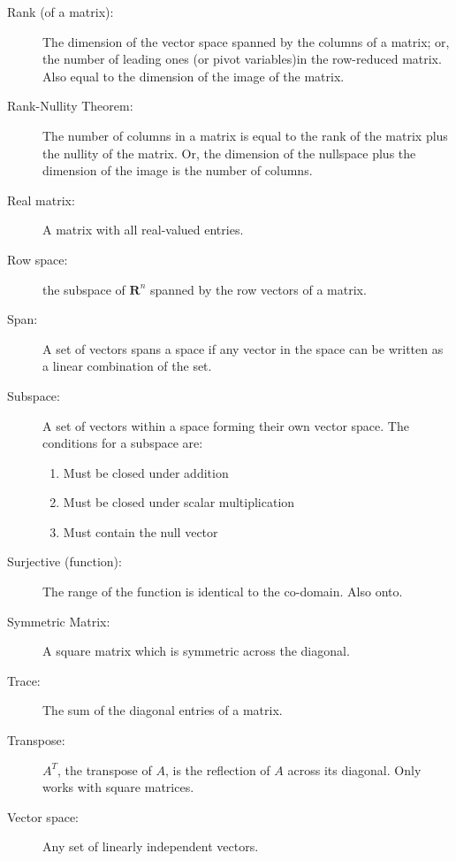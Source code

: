 \begin{description}
			\item[Rank (of a matrix):] The dimension of the vector space spanned by the columns of a matrix; or, the number of leading ones (or pivot variables)in the row-reduced matrix.
			Also equal to the dimension of the image of the matrix.
			
			\item[Rank-Nullity Theorem:] The number of columns in a matrix is equal to the rank of the matrix plus the nullity of the matrix. 
			Or, the dimension of the nullspace plus the dimension of the image is the number of columns.
			
			\item[Real matrix:] A matrix with all real-valued entries.
			
			\item[Row space:] the subspace of $\mathbf{R}^n$ spanned by the row vectors of a matrix.
			
			\item[Span:] A set of vectors spans a space if any vector in the space can be written as a linear combination of the set.
			
			\item[Subspace:] A set of vectors within a space forming their own vector space. The conditions for a subspace are:
			\begin{enumerate}
				\item Must be closed under addition
				\item Must be closed under scalar multiplication
				\item Must contain the null vector
			\end{enumerate}
			
			\item[Surjective (function):] The range of the function is identical to the co-domain. Also onto.
			
			\item[Symmetric Matrix:] A square matrix which is symmetric across the diagonal.
			
			\item[Trace:] The sum of the diagonal entries of a matrix.
			
			\item[Transpose:] $A^T$, the transpose of $A$, is the reflection of $A$ across its diagonal. Only works with square matrices.
			
			\item[Vector space:] Any set of linearly independent vectors.
			
		\end{description}

